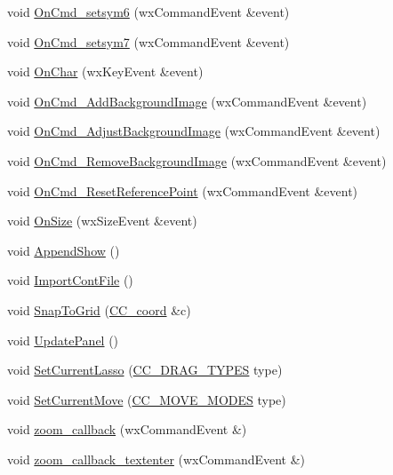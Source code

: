 \begin{DoxyCompactItemize}
\item 
void \hyperlink{a00102_a63875647c8d17afdbaba3eb8d116b1cb}{On\-Cmd\-\_\-setsym6} (wx\-Command\-Event \&event)
\item 
void \hyperlink{a00102_a4321676c47b8fdbb031947a7fd6e6076}{On\-Cmd\-\_\-setsym7} (wx\-Command\-Event \&event)
\item 
void \hyperlink{a00102_a2148f8ab3ea9a4abb29b195960d5fede}{On\-Char} (wx\-Key\-Event \&event)
\item 
void \hyperlink{a00102_ac3d741a3036e692764eee476eb9f03ac}{On\-Cmd\-\_\-\-Add\-Background\-Image} (wx\-Command\-Event \&event)
\item 
void \hyperlink{a00102_a4f1d57a933a600821d4bd252ead39f70}{On\-Cmd\-\_\-\-Adjust\-Background\-Image} (wx\-Command\-Event \&event)
\item 
void \hyperlink{a00102_a463c2f4e81980075eca428e49d0f7630}{On\-Cmd\-\_\-\-Remove\-Background\-Image} (wx\-Command\-Event \&event)
\item 
void \hyperlink{a00102_abdf0e708443c84e1a41a8498fb04f1ae}{On\-Cmd\-\_\-\-Reset\-Reference\-Point} (wx\-Command\-Event \&event)
\item 
void \hyperlink{a00102_a96868fe3dedf61df8893ec3cc720a6b6}{On\-Size} (wx\-Size\-Event \&event)
\item 
void \hyperlink{a00102_a37447b3e42b5ad8f5d81e880b42a1e9c}{Append\-Show} ()
\item 
void \hyperlink{a00102_ad902eed3ee13095c774c0d811db417c7}{Import\-Cont\-File} ()
\item 
void \hyperlink{a00102_a9403e4a0e34747f9eb938c9c3f39457b}{Snap\-To\-Grid} (\hyperlink{a00029}{C\-C\-\_\-coord} \&c)
\item 
void \hyperlink{a00102_a48310857b8b3b642014a13e19241beb6}{Update\-Panel} ()
\item 
void \hyperlink{a00102_af3ccd45c16d8739cf9a10b8443248793}{Set\-Current\-Lasso} (\hyperlink{a00216_a0fc7c44466a98380192d425c98f22aa6}{C\-C\-\_\-\-D\-R\-A\-G\-\_\-\-T\-Y\-P\-E\-S} type)
\item 
void \hyperlink{a00102_a1b4923723433790d578a8561c929ad56}{Set\-Current\-Move} (\hyperlink{a00216_a45558d38ac05e98ebdbffa5756372654}{C\-C\-\_\-\-M\-O\-V\-E\-\_\-\-M\-O\-D\-E\-S} type)
\item 
void \hyperlink{a00102_a1c4910ffd9774ca370e21b230fed082c}{zoom\-\_\-callback} (wx\-Command\-Event \&)
\item 
void \hyperlink{a00102_a03fa63bbd999a6f845a6c8b50eaa8f45}{zoom\-\_\-callback\-\_\-textenter} (wx\-Command\-Event \&)

\end{DoxyCompactItemize}
